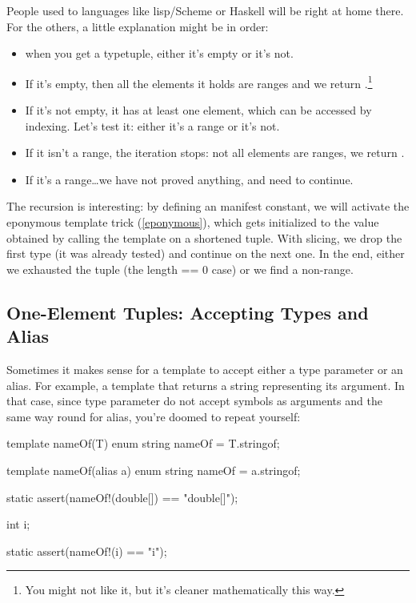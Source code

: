 People used to languages like lisp/Scheme or Haskell will be right at home there. For the others, a little explanation might be in order: 

\begin{itemize}
\item when you get a typetuple, either it's empty or it's not. 
	\item If it's empty, then all the elements it holds are ranges and we return .\footnote{ You might not like it, but it's cleaner mathematically this way.} 
	\item If it's not empty, it has at least one element, which can be accessed by indexing. Let's test it: either it's a range or it's not. 
		\item If it isn't a range, the iteration stops: not all elements are ranges, we return . 
		\item If it's a range\ldots we have not proved anything, and need to continue.
\end{itemize}

The recursion is interesting: by defining an  manifest constant, we will activate the eponymous template trick (\ref{eponymous}), which gets initialized to the value obtained by calling the template on a shortened tuple. With slicing, we drop the first type (it was already tested) and continue on the next one. In the end, either we exhausted the tuple (the length == 0 case) or we find a non-range.


\subsection{One-Element Tuples: Accepting Types and Alias}

Sometimes it makes sense for a template to accept either a type parameter or an alias. For example, a template that returns a string representing its argument. In that case, since type parameter do not accept symbols as arguments and the same way round for alias, you're doomed to repeat yourself:

\begin{dcode}
template nameOf(T)
{
    enum string nameOf = T.stringof;
}

template nameOf(alias a)
{
    enum string nameOf = a.stringof;
}

static assert(nameOf!(double[]) == "double[]");

int i;

static assert(nameOf!(i) == "i");
\end{dcode}

